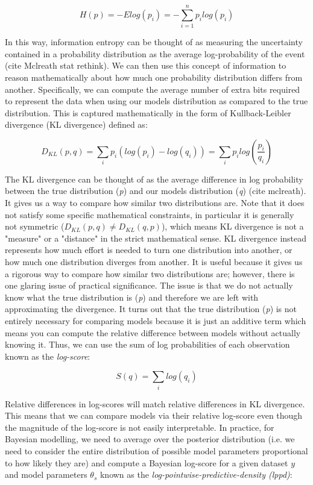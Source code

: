 \begin{equation}
H(p) = -Elog(p_i) = - \sum_{i=1}^{n} p_i log(p_i)
\end{equation}

In this way, information entropy can be thought of as measuring the uncertainty contained in a probability distribution as the average log-probability of the event (cite Mclreath stat rethink). We can then use this concept of information to reason mathematically about how much one probability distribution differs from another. Specifically, we can compute the average number of extra bits required to represent the data when using our models distribution as compared to the true distribution. This is captured mathematically in the form of Kullback-Leibler divergence (KL divergence) defined as:

\begin{equation}
D_{KL}(p,q) = \sum_{i} p_i (log(p_i) - log(q_i)) = \sum_{i} p_i log \left(\frac{p_i}{q_i} \right)
\end{equation}

The KL divergence can be thought of as the average difference in log probability between the true distribution (\textit{p}) and our models distribution (\textit{q}) (cite mclreath). It gives us a way to compare how similar two distributions are. Note that it does not satisfy some specific mathematical constraints, in particular it is generally not symmetric ($D_{KL}(p,q) \neq D_{KL}(q,p)$), which means KL divergence is not a "measure" or a "distance" in the strict mathematical sense. KL divergence instead represents how much effort is needed to turn one distribution into another, or how much one distribution diverges from another. It is useful because it gives us a rigorous way to compare how similar two distributions are; however, there is one glaring issue of practical significance. The issue is that we do not actually know what the true distribution is (\textit{p}) and therefore we are left with approximating the divergence. It turns out that the true distribution (\textit{p}) is not entirely necessary for comparing models because it is just an additive term which means you can compute the relative difference between models without actually knowing it. Thus, we can use the sum of log probabilities of each observation known as the \textit{log-score}:

\begin{equation}
S(q) = \sum_i log(q_i)
\end{equation}

Relative differences in log-scores will match relative differences in KL divergence. This means that we can compare models via their relative log-score even though the magnitude of the log-score is not easily interpretable. In practice, for Bayesian modelling, we need to average over the posterior distribution (i.e. we need to consider the entire distribution of possible model parameters proportional to how likely they are) and compute a Bayesian log-score for a given dataset $y$ and model parameters $\theta_s$ known as the \textit{log-pointwise-predictive-density (lppd)}:

